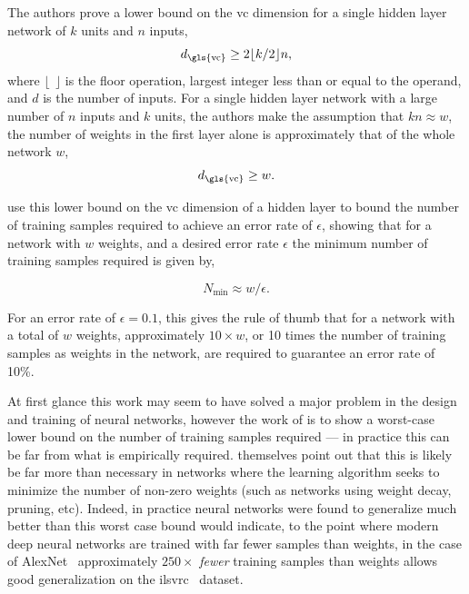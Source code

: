 \documentclass[thesis]{subfiles}
\begin{document}
    The authors prove a lower bound on the \gls{vc} dimension for a single hidden layer network of $k$ units and $n$ inputs,
    \begin{equation}
        d_{\textrm{\gls{vc}\index{VC dimension}}} \geq 2 \lfloor k/2 \rfloor n,
    \end{equation}
    where $\lfloor \ \ \rfloor$ is the floor operation, \ie largest integer less than or equal to the operand, and $d$ is the number of inputs. For a single hidden layer network with a large number of $n$ inputs and $k$ units, the authors make the assumption that $kn\approx w$, \ie the number of weights in the first layer alone is approximately that of the whole network $w$,
    \begin{equation}
        d_{\textrm{\gls{vc}\index{VC dimension}}} \geq w.
    \end{equation}

    \citet{baum1989size} use this lower bound on the \gls{vc} dimension of a hidden layer to bound the number of training samples required to achieve an error rate of $\epsilon$, showing that for a network with $w$ weights, and a desired error rate $\epsilon$ the minimum number of training samples required is given by,
    
    \begin{equation}
        N_{\min} \approx w/\epsilon.
    \end{equation}
    
    For an error rate of $\epsilon=0.1$, this gives the rule of thumb that for a network with a total of $w$ weights, approximately $10\times w$, or 10 times the number of training samples as weights in the network, are required to guarantee an error rate of 10\%. 
    
    At first glance this work may seem to have solved a major problem in the design and training of neural networks, however the work of \citet{baum1989size} is to show a worst-case lower bound on the number of training samples required --- in practice this can be far from what is empirically required. \citet{baum1989size} themselves point out that this is likely be far more than necessary in networks where the learning algorithm seeks to minimize the number of non-zero weights (such as networks using weight decay, pruning, etc). Indeed, in practice neural networks were found to generalize much better than this worst case bound would indicate, to the point where modern deep neural networks are trained with far fewer samples than weights, in the case of AlexNet~\citep{Krizhevsky2012} approximately $250\times$ \emph{fewer} training samples than weights allows good generalization on the \gls{ilsvrc}~\citep{ILSVRC2015} dataset.
    
\end{document}
